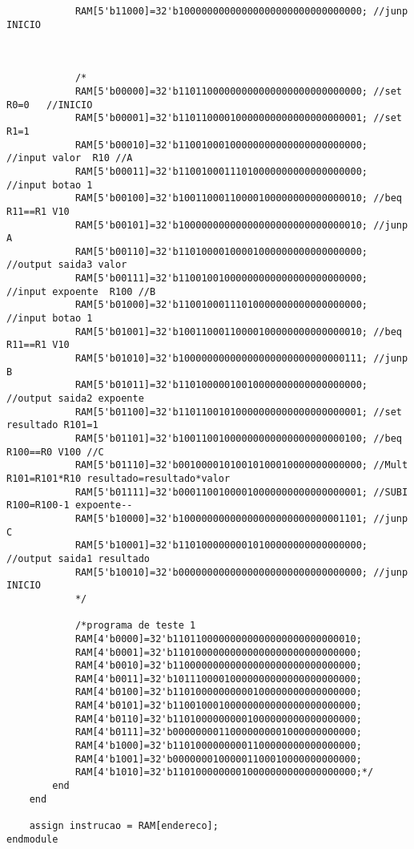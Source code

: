 \begin{lstlisting}
			RAM[5'b11000]=32'b10000000000000000000000000000000; //junp INICIO
			
			
			
			/*
			RAM[5'b00000]=32'b11011000000000000000000000000000; //set R0=0   //INICIO
			RAM[5'b00001]=32'b11011000010000000000000000000001; //set R1=1
			RAM[5'b00010]=32'b11001000100000000000000000000000; //input valor  R10 //A 
			RAM[5'b00011]=32'b11001000111010000000000000000000; //input botao 1
			RAM[5'b00100]=32'b10011000110000100000000000000010; //beq R11==R1 V10
			RAM[5'b00101]=32'b10000000000000000000000000000010; //junp A
			RAM[5'b00110]=32'b11010000100001000000000000000000; //output saida3 valor
			RAM[5'b00111]=32'b11001001000000000000000000000000; //input expoente  R100 //B 
			RAM[5'b01000]=32'b11001000111010000000000000000000; //input botao 1
			RAM[5'b01001]=32'b10011000110000100000000000000010; //beq R11==R1 V10
			RAM[5'b01010]=32'b10000000000000000000000000000111; //junp B
			RAM[5'b01011]=32'b11010000010010000000000000000000; //output saida2 expoente
			RAM[5'b01100]=32'b11011001010000000000000000000001; //set resultado R101=1
			RAM[5'b01101]=32'b10011001000000000000000000000100; //beq R100==R0 V100 //C
			RAM[5'b01110]=32'b00100001010010100010000000000000; //Mult R101=R101*R10 resultado=resultado*valor
			RAM[5'b01111]=32'b00011001000010000000000000000001; //SUBI R100=R100-1 expoente--
			RAM[5'b10000]=32'b10000000000000000000000000001101; //junp C
			RAM[5'b10001]=32'b11010000000010100000000000000000; //output saida1 resultado 
			RAM[5'b10010]=32'b00000000000000000000000000000000; //junp INICIO
			*/
			
			/*programa de teste 1
			RAM[4'b0000]=32'b11011000000000000000000000000010;
			RAM[4'b0001]=32'b11010000000000000000000000000000;
			RAM[4'b0010]=32'b11000000000000000000000000000000;
			RAM[4'b0011]=32'b10111000010000000000000000000000;
			RAM[4'b0100]=32'b11010000000000100000000000000000;
			RAM[4'b0101]=32'b11001000100000000000000000000000;
			RAM[4'b0110]=32'b11010000000001000000000000000000;
			RAM[4'b0111]=32'b00000000110000000001000000000000;
			RAM[4'b1000]=32'b11010000000001100000000000000000;
			RAM[4'b1001]=32'b00000001000001100010000000000000;
			RAM[4'b1010]=32'b11010000000010000000000000000000;*/
		end
	end
	
	assign instrucao = RAM[endereco];
endmodule


\end{lstlisting}
\clearpage

